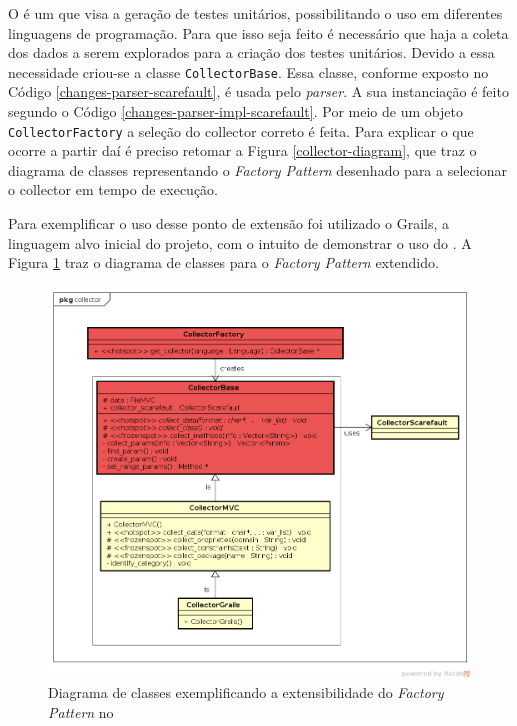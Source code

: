 O \scarefault é um \framework que visa a geração de testes unitários, possibilitando
o uso em diferentes linguagens de programação. Para que isso seja feito é necessário
que haja a coleta dos dados a serem explorados para a criação dos testes unitários.
Devido a essa necessidade criou-se a classe \lstinline|CollectorBase|. Essa classe,
conforme exposto no Código \ref{changes-parser-scarefault}, é usada pelo \textit{parser}.
A sua instanciação é feito segundo o Código \ref{changes-parser-impl-scarefault}. Por
meio de um objeto \lstinline|CollectorFactory| a seleção do \textsf{collector} correto
é feita. Para explicar o que ocorre a partir daí é preciso retomar a Figura
\ref{collector-diagram}, que traz o diagrama de classes representando o
\textit{Factory Pattern} desenhado para a selecionar o \textsf{collector} em tempo
de execução.

Para exemplificar o uso desse ponto de extensão foi utilizado o \textsf{Grails}, a linguagem
alvo inicial do projeto, com o intuito de demonstrar o uso do \Scarefault. A Figura
\ref{collector-grails-class-diagram} traz o diagrama de classes para o
\textit{Factory Pattern} extendido.
\begin{figure}[h]
  \centering
    \includegraphics[width=\textwidth]{figuras/collector-grails-class-diagram.png}
    \caption{Diagrama de classes exemplificando a extensibilidade do \textit{Factory Pattern} no \framework}
    \label{collector-grails-class-diagram}
\end{figure}
\FloatBarrier

